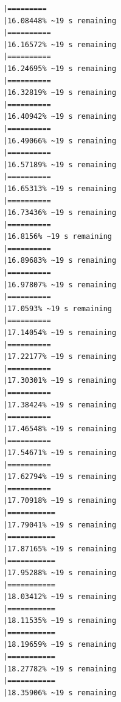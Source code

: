 \documentclass{article}\usepackage[]{graphicx}\usepackage[]{xcolor}
\makeatletter
\newenvironment{kframe}{%
 \def\at@end@of@kframe{}%
 \ifinner\ifhmode%
  \def\at@end@of@kframe{\end{minipage}}%
  \begin{minipage}{\columnwidth}%
 \fi\fi%
 \def\FrameCommand##1{\hskip\@totalleftmargin \hskip-\fboxsep
 \colorbox{shadecolor}{##1}\hskip-\fboxsep
     \hskip-\linewidth \hskip-\@totalleftmargin \hskip\columnwidth}%
 \MakeFramed {\advance\hsize-\width
   \@totalleftmargin\z@ \linewidth\hsize
   \@setminipage}}%
 {\par\unskip\endMakeFramed%
 \at@end@of@kframe}
\newenvironment{knitrout}{}{} %
\makeatother
\begin{document}
\begin{knitrout}
\begin{kframe}
\begin{verbatim}
|=========                                                     |16.08448% ~19 s remaining 
|==========                                                    |16.16572% ~19 s remaining 
|==========                                                    |16.24695% ~19 s remaining 
|==========                                                    |16.32819% ~19 s remaining 
|==========                                                    |16.40942% ~19 s remaining 
|==========                                                    |16.49066% ~19 s remaining 
|==========                                                    |16.57189% ~19 s remaining 
|==========                                                    |16.65313% ~19 s remaining 
|==========                                                    |16.73436% ~19 s remaining 
|==========                                                    |16.8156% ~19 s remaining  
|==========                                                    |16.89683% ~19 s remaining 
|==========                                                    |16.97807% ~19 s remaining 
|==========                                                    |17.0593% ~19 s remaining  
|==========                                                    |17.14054% ~19 s remaining 
|==========                                                    |17.22177% ~19 s remaining 
|==========                                                    |17.30301% ~19 s remaining 
|==========                                                    |17.38424% ~19 s remaining 
|==========                                                    |17.46548% ~19 s remaining 
|==========                                                    |17.54671% ~19 s remaining 
|==========                                                    |17.62794% ~19 s remaining 
|==========                                                    |17.70918% ~19 s remaining 
|===========                                                   |17.79041% ~19 s remaining 
|===========                                                   |17.87165% ~19 s remaining 
|===========                                                   |17.95288% ~19 s remaining 
|===========                                                   |18.03412% ~19 s remaining 
|===========                                                   |18.11535% ~19 s remaining 
|===========                                                   |18.19659% ~19 s remaining 
|===========                                                   |18.27782% ~19 s remaining 
|===========                                                   |18.35906% ~19 s remaining 

\end{verbatim}
\end{kframe}
\end{knitrout}
\end{document}
